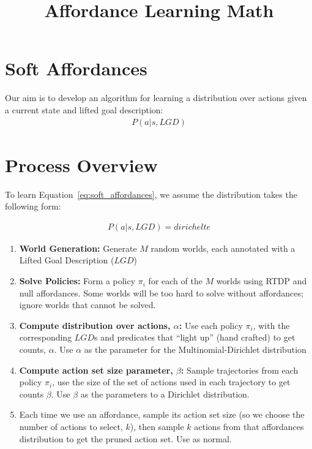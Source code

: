\documentclass[]{article}
\title{Affordance Learning Math}
\begin{document}
\date{}
\maketitle


\section*{Soft Affordances}

Our aim is to develop an algorithm for learning a distribution over
actions given a current state and lifted goal description:
\begin{align}
P(a | s, LGD)\label{eq:soft_affordances}
\end{align}


\section*{Process Overview}

To learn Equation~\ref{eq:soft_affordances}, we assume the
distribution takes the following form:

\begin{align}
P(a | s, LGD) = dirichelte \label{eq:soft_affordances}
\end{align}


\begin{enumerate}[1)]
\item {\bf World Generation:} Generate $M$ random worlds, each annotated with a Lifted Goal Description ($LGD$)
\item {\bf Solve Policies:} Form a policy $\pi_i$ for each of the $M$
  worlds using RTDP and null affordances.  Some worlds will be too
  hard to solve without affordances; ignore worlds that cannot be solved.
\item {\bf Compute distribution over actions, $\alpha$:} Use each policy $\pi_i$, with the corresponding $LGD$s and predicates that ``light up'' (hand crafted) to get counts, $\alpha$. Use $\alpha$ as the parameter for the Multinomial-Dirichlet distribution
\item {\bf Compute action set size parameter, $\beta$:} Sample trajectories from each policy $\pi_i$, use the size of the set of actions used in each trajectory to get counts $\beta$. Use $\beta$ as the parameters to a Dirichlet distribution.
\item Each time we use an affordance, sample its action set size (so we choose the number of actions to select, $k$), then sample $k$ actions from that affordances distribution to get the pruned action set. Use as normal.
\end{enumerate}
\end{document}
